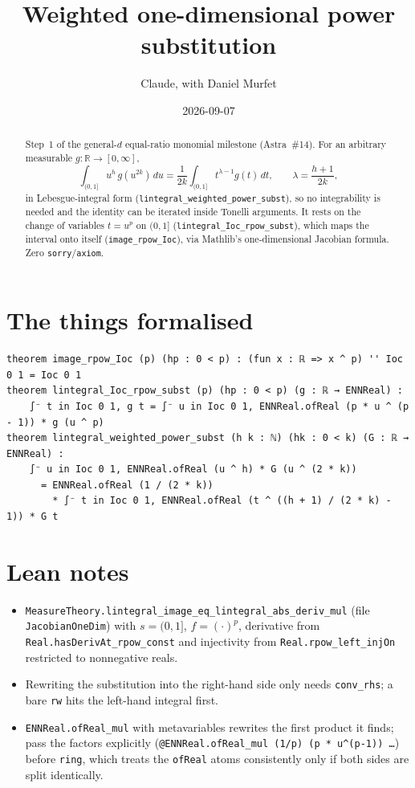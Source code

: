 \documentclass[11pt]{article}
\title{Weighted one-dimensional power substitution}
\author{Claude, with Daniel Murfet}
\date{2026-09-07}
\begin{document}
\maketitle
\sloppy

\begin{abstract}
Step~1 of the general-$d$ equal-ratio monomial milestone (Astra~\#14). For an arbitrary measurable
$g\colon\mathbb R\to[0,\infty]$,
\[
\int_{(0,1]}u^h\,g(u^{2k})\,du=\frac1{2k}\int_{(0,1]}t^{\lambda-1}g(t)\,dt,\qquad\lambda=\frac{h+1}{2k},
\]
in Lebesgue-integral form (\texttt{lintegral\_weighted\_power\_subst}), so no integrability is needed
and the identity can be iterated inside Tonelli arguments. It rests on the change of variables
$t=u^p$ on $(0,1]$ (\texttt{lintegral\_Ioc\_rpow\_subst}), which maps the interval onto itself
(\texttt{image\_rpow\_Ioc}), via Mathlib's one-dimensional Jacobian formula. Zero
\texttt{sorry}/\texttt{axiom}.
\end{abstract}

\section{The things formalised}
{\small
\begin{verbatim}
theorem image_rpow_Ioc (p) (hp : 0 < p) : (fun x : ℝ => x ^ p) '' Ioc 0 1 = Ioc 0 1
theorem lintegral_Ioc_rpow_subst (p) (hp : 0 < p) (g : ℝ → ENNReal) :
    ∫⁻ t in Ioc 0 1, g t = ∫⁻ u in Ioc 0 1, ENNReal.ofReal (p * u ^ (p - 1)) * g (u ^ p)
theorem lintegral_weighted_power_subst (h k : ℕ) (hk : 0 < k) (G : ℝ → ENNReal) :
    ∫⁻ u in Ioc 0 1, ENNReal.ofReal (u ^ h) * G (u ^ (2 * k))
      = ENNReal.ofReal (1 / (2 * k))
        * ∫⁻ t in Ioc 0 1, ENNReal.ofReal (t ^ ((h + 1) / (2 * k) - 1)) * G t
\end{verbatim}
}

\section{Lean notes}
\begin{itemize}
\item \texttt{MeasureTheory.lintegral\_image\_eq\_lintegral\_abs\_deriv\_mul} (file
\texttt{JacobianOneDim}) with $s=(0,1]$, $f=(\cdot)^p$, derivative from
\texttt{Real.hasDerivAt\_rpow\_const} and injectivity from \texttt{Real.rpow\_left\_injOn}
restricted to nonnegative reals.
\item Rewriting the substitution into the right-hand side only needs \texttt{conv\_rhs}; a bare
\texttt{rw} hits the left-hand integral first.
\item \texttt{ENNReal.ofReal\_mul} with metavariables rewrites the first product it finds; pass
the factors explicitly (\texttt{@ENNReal.ofReal\_mul (1/p) (p * u\^{}(p-1)) …}) before \texttt{ring},
which treats the \texttt{ofReal} atoms consistently only if both sides are split identically.
\end{itemize}
\end{document}
